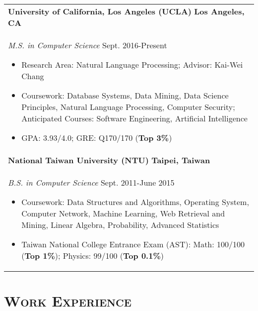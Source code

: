 \documentclass[a4paper,11pt]{article} %
\begin{document}
{%
\begin{tabular}{p{18.5cm}}
{\bf{University of California, Los Angeles (UCLA)}}  \hfill \bf{Los Angeles, CA}\\
{\it M.S. in Computer Science} \hfill  Sept. 2016-Present
\begin{itemize}
\item Research Area: Natural Language Processing; Advisor: Kai-Wei Chang
\item Coursework: Database Systems, Data Mining, Data Science Principles, Natural Language Processing, Computer Security; Anticipated Courses: Software Engineering, Artificial Intelligence%
\item GPA: 3.93/4.0; GRE: Q170/170 (\textbf{Top 3\%})\vspace*{-\baselineskip}
\end{itemize}\\ 
\vspace{.1mm}
%
{\bf{National Taiwan University (NTU)}} \hfill \bf{Taipei, Taiwan}\\
{\it B.S. in Computer Science} \hfill Sept. 2011-June 2015
\begin{itemize}
\item Coursework: Data Structures and Algorithms, Operating System, Computer Network, Machine Learning, Web Retrieval and Mining, Linear Algebra, Probability, Advanced Statistics 
\item Taiwan National College Entrance Exam (AST):  Math: 100/100 (\textbf{Top 1\%}); Physics: 99/100 (\textbf{Top 0.1\%})\vspace*{-\baselineskip}
\end{itemize} 
\end{tabular}

\section{\Large\bf\textsc{Work Experience}}
\begin{tabular}{p{18.5cm}}


\end{tabular}}
\end{document}
